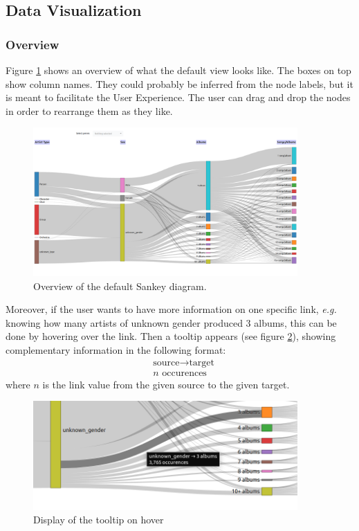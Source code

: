 \documentclass[a4paper, 11pt, oneside]{article}
\newcommand{\eg}{\textit{e.g. }}
\begin{document}
\subsection{Data Visualization}
\subsubsection{Overview}
Figure \ref{fig:joris_sankey_overview} shows an overview of what the default view looks like. The boxes on top show column names. They could probably be inferred from the node labels, but it is meant to facilitate the User Experience. The user can drag and drop the nodes in order to rearrange them as they like.

\begin{figure}[ht]
    \centering
    \includegraphics[width=0.9\textwidth]{Images/joris-sankey-overview.png}
    \caption{Overview of the default Sankey diagram.}
    \label{fig:joris_sankey_overview}
\end{figure}

Moreover, if the user wants to have more information on one specific link, \eg knowing how many artists of unknown gender produced 3 albums, this can be done by hovering over the link. Then a tooltip appears (see figure \ref{fig:joris_sankey_tooltip}), showing complementary information in the following format:
\begin{align*}
     & \text{source} \to \text{target} \\
     & n \text{ occurences}
\end{align*}
where \(n\) is the link value from the given source to the given target.


\begin{figure}[ht]
    \centering
    \includegraphics[width=0.9\textwidth]{Images/joris-sankey-tooltip.png}
    \caption{Display of the tooltip on hover}
    \label{fig:joris_sankey_tooltip}
\end{figure}
\end{document}
